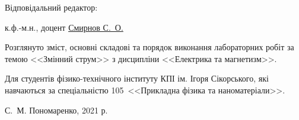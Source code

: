 {\begin{alwayssingle}
        \vspace*{2em}
		\noindent%
        \begin{minipage}[t]{0.2\linewidth}
            	\begin{flushleft}
                    Відповідальний редактор:
                \end{flushleft}
        \end{minipage}\hfill
        \begin{minipage}[t]{0.78\linewidth}
                к.ф.-м.н., доцент \href{http://ipt.kpi.ua/smirnov}{Смирнов С.~О.}
        \end{minipage}

        \vspace*{2em}
		\noindent%

        \vfill

		Розглянуто зміст, основні складові та порядок виконання лабораторних робіт за темою <<Змінний струм>> з дисципліни <<Електрика та магнетизм>>. 

		Для студентів фізико-технічного інституту КПІ ім. Ігоря Сікорського, які навчаються за спеціальністю 105~<<Прикладна фізика та наноматеріали>>.
		
		\vfill
				
	\begin{flushright}
        \textcopyright{} С.~М. Пономаренко, 2021 р.
    \end{flushright}
		\newpage%
	\end{alwayssingle}
}



